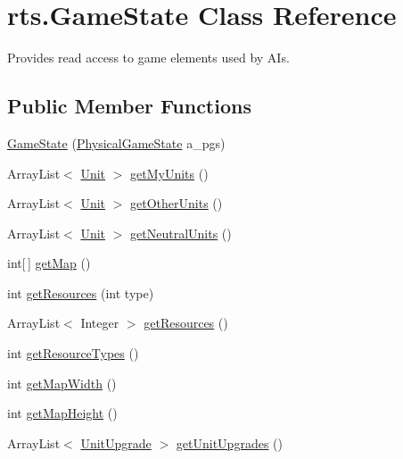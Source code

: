 \hypertarget{classrts_1_1_game_state}{
\section{rts.GameState Class Reference}
\label{classrts_1_1_game_state}
}


Provides read access to game elements used by AIs.  


\subsection*{Public Member Functions}
\begin{DoxyCompactItemize}
\item 
\hyperlink{classrts_1_1_game_state_ab0522c9d44d88d21cf9aeb5357655580}{GameState} (\hyperlink{classrts_1_1_physical_game_state}{PhysicalGameState} a\_\-pgs)
\item 
ArrayList$<$ \hyperlink{classrts_1_1units_1_1_unit}{Unit} $>$ \hyperlink{classrts_1_1_game_state_a7c782cec7800b39974e1bb1f1fdc4232}{getMyUnits} ()
\item 
ArrayList$<$ \hyperlink{classrts_1_1units_1_1_unit}{Unit} $>$ \hyperlink{classrts_1_1_game_state_a1184758768b215a209c88ce291bfe73d}{getOtherUnits} ()
\item 
ArrayList$<$ \hyperlink{classrts_1_1units_1_1_unit}{Unit} $>$ \hyperlink{classrts_1_1_game_state_a915302bd7f6a886c7e4bb6bdce5a2552}{getNeutralUnits} ()
\item 
int\mbox{[}$\,$\mbox{]} \hyperlink{classrts_1_1_game_state_ab624a7bdb7e1899272f250f70d2069b1}{getMap} ()
\item 
int \hyperlink{classrts_1_1_game_state_a03c25b47217dcab0f05579749b246f85}{getResources} (int type)
\item 
ArrayList$<$ Integer $>$ \hyperlink{classrts_1_1_game_state_a7190a4f5cac02e2a8e8886e8dbdb9c65}{getResources} ()
\item 
int \hyperlink{classrts_1_1_game_state_ae1bce4055b4dd7d72086dd088a8fb68b}{getResourceTypes} ()
\item 
int \hyperlink{classrts_1_1_game_state_ac1358dbc75a5d67cb514a4780a4f3f5a}{getMapWidth} ()
\item 
int \hyperlink{classrts_1_1_game_state_a7ce630ad8baf4951791dbb1fdaeb25e7}{getMapHeight} ()
\item 
ArrayList$<$ \hyperlink{classrts_1_1units_1_1_unit_upgrade}{UnitUpgrade} $>$ \hyperlink{classrts_1_1_game_state_a00fda1a4125d809e1133952996dc65cb}{getUnitUpgrades} ()
\item 

\end{DoxyCompactItemize}
